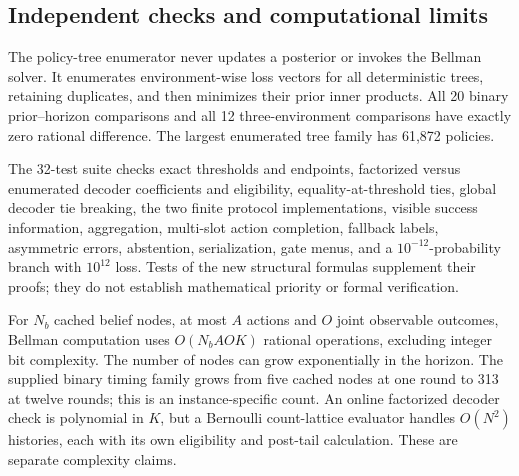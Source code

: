 \subsection{Independent checks and computational limits}
The policy-tree enumerator never updates a posterior or invokes the Bellman
solver. It enumerates environment-wise loss vectors for all deterministic
trees, retaining duplicates, and then minimizes their prior inner products.
All 20 binary prior--horizon comparisons and all 12 three-environment
comparisons have exactly zero rational difference. The largest enumerated
tree family has 61,872 policies.

The 32-test suite checks exact thresholds and endpoints, factorized versus
enumerated decoder coefficients and eligibility, equality-at-threshold ties,
global decoder tie breaking, the two finite protocol implementations,
visible success information, aggregation, multi-slot action completion,
fallback labels, asymmetric errors, abstention, serialization, gate menus,
and a $10^{-12}$-probability branch with $10^{12}$ loss. Tests of the new
structural formulas supplement their proofs; they do not establish
mathematical priority or formal verification.

For $N_b$ cached belief nodes, at most $A$ actions and $O$ joint observable
outcomes, Bellman computation uses $O(N_bAOK)$ rational operations, excluding
integer bit complexity. The number of nodes can grow exponentially in the
horizon. The supplied binary timing family grows from five cached nodes at
one round to 313 at twelve rounds; this is an instance-specific count.
An online factorized decoder check is polynomial in $K$, but a Bernoulli
count-lattice evaluator handles $O(N^2)$ histories, each with its own
eligibility and post-tail calculation. These are separate complexity claims.
